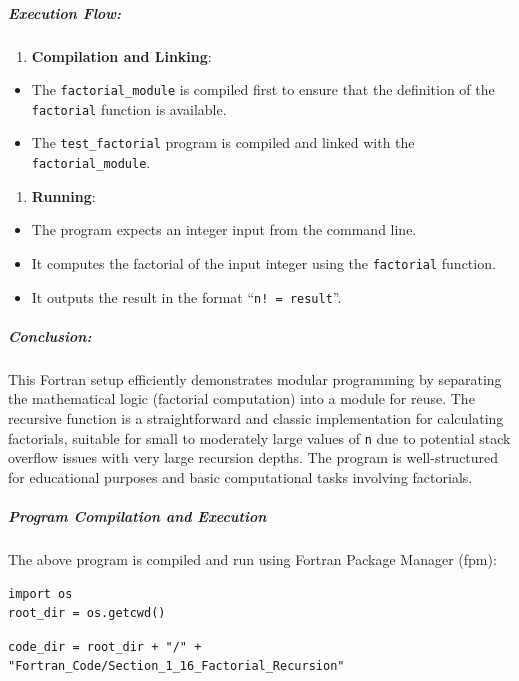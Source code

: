 \subparagraph{Execution Flow:}

\begin{enumerate}
\item \textbf{Compilation and Linking}:
\end{enumerate}

\begin{itemize}
\item The \texttt{factorial\_module} is compiled first to ensure that the definition of the \texttt{factorial} function is available.
\item The \texttt{test\_factorial} program is compiled and linked with the \texttt{factorial\_module}.
\end{itemize}

\begin{enumerate}[resume]
\item \textbf{Running}:
\end{enumerate}

\begin{itemize}
\item The program expects an integer input from the command line.
\item It computes the factorial of the input integer using the \texttt{factorial} function.
\item It outputs the result in the format ``\texttt{n! = result}''.
\end{itemize}

\subparagraph{Conclusion:}

This Fortran setup efficiently demonstrates modular programming by separating the mathematical logic (factorial computation) into a module for reuse. The recursive function is a straightforward and classic implementation for calculating factorials, suitable for small to moderately large values of \texttt{n} due to potential stack overflow issues with very large recursion depths. The program is well-structured for educational purposes and basic computational tasks involving factorials.

\subparagraph{Program Compilation and Execution}

The above program is compiled and run using Fortran Package Manager (fpm):

\begin{verbatim}
import os
root_dir = os.getcwd()
\end{verbatim}

\begin{verbatim}
code_dir = root_dir + "/" + "Fortran_Code/Section_1_16_Factorial_Recursion"
\end{verbatim}

